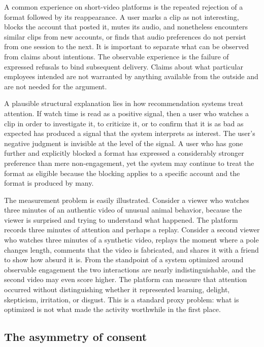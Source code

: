 \documentclass[12pt]{article}
\theoremstyle{plain}
\theoremstyle{definition}
\theoremstyle{remark}
\begin{document}
A common experience on short-video platforms is the repeated rejection of a format followed by its reappearance. A user marks a clip as not interesting, blocks the account that posted it, mutes its audio, and nonetheless encounters similar clips from new accounts, or finds that audio preferences do not persist from one session to the next. It is important to separate what can be observed from claims about intentions. The observable experience is the failure of expressed refusals to bind subsequent delivery. Claims about what particular employees intended are not warranted by anything available from the outside and are not needed for the argument.

A plausible structural explanation lies in how recommendation systems treat attention. If watch time is read as a positive signal, then a user who watches a clip in order to investigate it, to criticize it, or to confirm that it is as bad as expected has produced a signal that the system interprets as interest. The user's negative judgment is invisible at the level of the signal. A user who has gone further and explicitly blocked a format has expressed a considerably stronger preference than mere non-engagement, yet the system may continue to treat the format as eligible because the blocking applies to a specific account and the format is produced by many.

The measurement problem is easily illustrated. Consider a viewer who watches three minutes of an authentic video of unusual animal behavior, because the viewer is surprised and trying to understand what happened. The platform records three minutes of attention and perhaps a replay. Consider a second viewer who watches three minutes of a synthetic video, replays the moment where a pole changes length, comments that the video is fabricated, and shares it with a friend to show how absurd it is. From the standpoint of a system optimized around observable engagement the two interactions are nearly indistinguishable, and the second video may even score higher. The platform can measure that attention occurred without distinguishing whether it represented learning, delight, skepticism, irritation, or disgust. This is a standard proxy problem: what is optimized is not what made the activity worthwhile in the first place.

\subsection{The asymmetry of consent}
\end{document}
